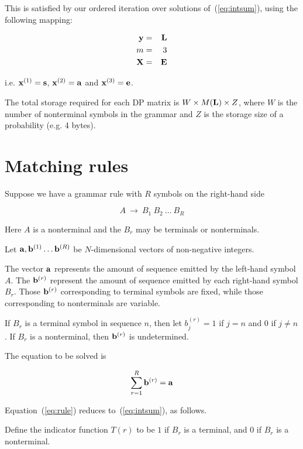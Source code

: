 \documentclass{article}
\begin{document}
This is satisfied by our ordered iteration over solutions of~(\ref{eq:intsum}),
using the following mapping:

\begin{eqnarray*}
      {\bf y} & = & {\bf L} \\
            m & = & 3 \\
      {\bf X} & = & {\bf E}
\end{eqnarray*}

i.e.
 ${\bf x}^{(1)} = {\bf s}$,
 ${\bf x}^{(2)} = {\bf a}$ and
 ${\bf x}^{(3)} = {\bf e}$.

The total storage required for each DP matrix is
$W \times M({\bf L}) \times Z$,
where $W$ is the number of nonterminal symbols in the grammar
and $Z$ is the storage size of a probability (e.g. 4 bytes).


\section{Matching rules}
\label{sec:MatchRule}

Suppose we have a grammar rule with $R$ symbols on the right-hand side

\[
A\ \to\ B_1\ B_2\ \ldots\ B_R
\]

Here $A$ is a nonterminal and the $B_r$ may be terminals or nonterminals.

Let ${\bf a}, {\bf b}^{(1)} \ldots {\bf b}^{(R)}$ be $N$-dimensional vectors of non-negative integers.

The vector ${\bf a}$ represents the amount of sequence emitted by the left-hand symbol $A$.
The ${\bf b}^{(r)}$ represent the amount of sequence emitted by each right-hand symbol $B_r$.
Those ${\bf b}^{(r)}$ corresponding to terminal symbols are fixed,
while those corresponding to nonterminals are variable.

If $B_r$ is a terminal symbol in sequence $n$,
then let $b^{(r)}_j=1$ if $j=n$ and $0$ if $j \neq n$.
If $B_r$ is a nonterminal, then ${\bf b}^{(r)}$ is undetermined.

The equation to be solved is

\begin{equation}
\sum_{r=1}^R {\bf b}^{(r)} = {\bf a}
\label{eq:rule}
\end{equation}

Equation~(\ref{eq:rule}) reduces to~(\ref{eq:intsum}), as follows.

Define the indicator function $T(r)$
to be $1$ if $B_r$ is a terminal, and $0$ if $B_r$ is a nonterminal.
\end{document}
